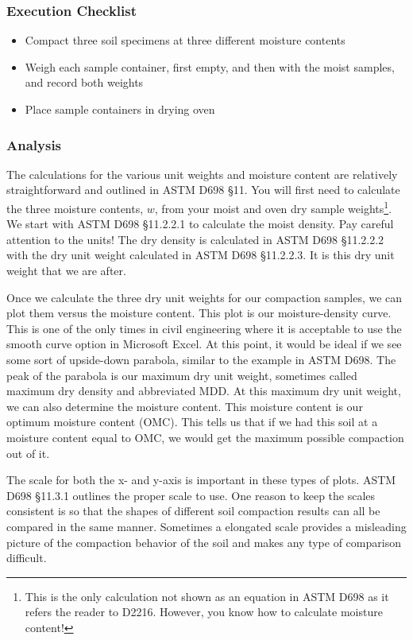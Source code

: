 \documentclass[12pt]{article}
\begin{document}
\subsubsection*{Execution Checklist}
\begin{itemize}
    \item Compact three soil specimens at three different moisture contents
    \item Weigh each sample container, first empty, and then with the moist samples, and record both weights
    \item Place sample containers in drying oven
\end{itemize}

\subsubsection{Analysis}
The calculations for the various unit weights and moisture content are relatively straightforward and outlined in ASTM D698 \S11. You will first need to calculate the three moisture contents, $w$, from your moist and oven dry sample weights\footnote{This is the only calculation not shown as an equation in ASTM D698 as it refers the reader to D2216. However, you know how to calculate moisture content!}. We start with ASTM D698 \S11.2.2.1 to calculate the moist density. Pay careful attention to the units! The dry density is calculated in ASTM D698 \S11.2.2.2 with the dry unit weight calculated in ASTM D698 \S11.2.2.3. It is this dry unit weight that we are after.

Once we calculate the three dry unit weights for our compaction samples, we can plot them versus the moisture content. This plot is our moisture-density curve. This is one of the only times in civil engineering where it is acceptable to use the smooth curve option in Microsoft Excel\textregistered{}. At this point, it would be ideal if we see some sort of upside-down parabola, similar to the example in ASTM D698. The peak of the parabola is our maximum dry unit weight, sometimes called maximum dry density and abbreviated MDD. At this maximum dry unit weight, we can also determine the moisture content. This moisture content is our optimum moisture content (OMC). This tells us that if we had this soil at a moisture content equal to OMC, we would get the maximum possible compaction out of it.

The scale for both the x- and y-axis is important in these types of plots. ASTM D698 \S11.3.1 outlines the proper scale to use. One reason to keep the scales consistent is so that the shapes of different soil compaction results can all be compared in the same manner. Sometimes a elongated scale provides a misleading picture of the compaction behavior of the soil and makes any type of comparison difficult.
\end{document}
